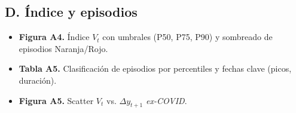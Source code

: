 \documentclass[11pt,a4paper]{article}
\newcommand{\1}{\mathbf{1}}
\begin{document}
\subsection*{D. Índice y episodios}
\begin{itemize}
  \item \textbf{Figura A4.} Índice $V_t$ con umbrales (P50, P75, P90) y sombreado de episodios Naranja/Rojo.
  \item \textbf{Tabla A5.} Clasificación de episodios por percentiles y fechas clave (picos, duración).
  \item \textbf{Figura A5.} Scatter $V_t$ vs. $\Delta y_{t+1}$ \emph{ex-COVID}.
\end{itemize}
\end{document}
